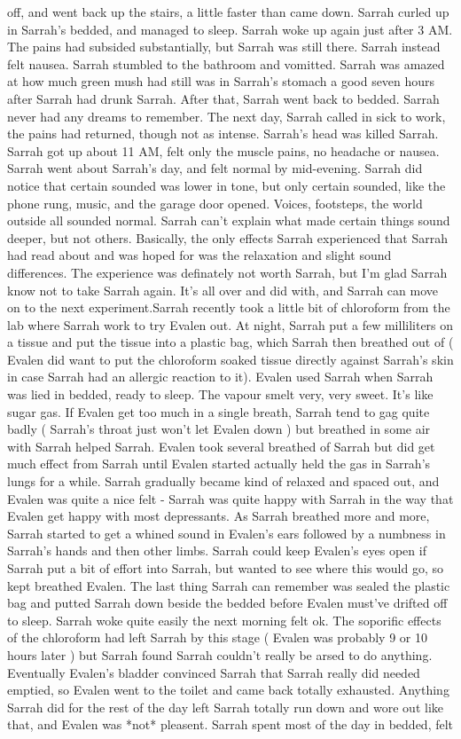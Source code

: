\documentclass[12pt]{book}
\begin{document}
off, and went back up the stairs, a little faster than came down. Sarrah curled up in Sarrah's bedded, and managed to sleep. Sarrah woke up again just after 3 AM. The pains had subsided substantially, but Sarrah was still there. Sarrah instead felt nausea. Sarrah stumbled to the bathroom and vomitted. Sarrah was amazed at how much green mush had still was in Sarrah's stomach a good seven hours after Sarrah had drunk Sarrah. After that, Sarrah went back to bedded. Sarrah never had any dreams to remember. The next day, Sarrah called in sick to work, the pains had returned, though not as intense. Sarrah's head was killed Sarrah. Sarrah got up about 11 AM, felt only the muscle pains, no headache or nausea. Sarrah went about Sarrah's day, and felt normal by mid-evening. Sarrah did notice that certain sounded was lower in tone, but only certain sounded, like the phone rung, music, and the garage door opened. Voices, footsteps, the world outside all sounded normal. Sarrah can't explain what made certain things sound deeper, but not others. Basically, the only effects Sarrah experienced that Sarrah had read about and was hoped for was the relaxation and slight sound differences. The experience was definately not worth Sarrah, but I'm glad Sarrah know not to take Sarrah again. It's all over and did with, and Sarrah can move on to the next experiment.Sarrah recently took a little bit of chloroform from the lab where Sarrah work to try Evalen out. At night, Sarrah put a few milliliters on a tissue and put the tissue into a plastic bag, which Sarrah then breathed out of ( Evalen did want to put the chloroform soaked tissue directly against Sarrah's skin in case Sarrah had an allergic reaction to it). Evalen used Sarrah when Sarrah was lied in bedded, ready to sleep. The vapour smelt very, very sweet. It's like sugar gas. If Evalen get too much in a single breath, Sarrah tend to gag quite badly ( Sarrah's throat just won't let Evalen down ) but breathed in some air with Sarrah helped Sarrah. Evalen took several breathed of Sarrah but did get much effect from Sarrah until Evalen started actually held the gas in Sarrah's lungs for a while. Sarrah gradually became kind of relaxed and spaced out, and Evalen was quite a nice felt - Sarrah was quite happy with Sarrah in the way that Evalen get happy with most depressants. As Sarrah breathed more and more, Sarrah started to get a whined sound in Evalen's ears followed by a numbness in Sarrah's hands and then other limbs. Sarrah could keep Evalen's eyes open if Sarrah put a bit of effort into Sarrah, but wanted to see where this would go, so kept breathed Evalen. The last thing Sarrah can remember was sealed the plastic bag and putted Sarrah down beside the bedded before Evalen must've drifted off to sleep. Sarrah woke quite easily the next morning felt ok. The soporific effects of the chloroform had left Sarrah by this stage ( Evalen was probably 9 or 10 hours later ) but Sarrah found Sarrah couldn't really be arsed to do anything. Eventually Evalen's bladder convinced Sarrah that Sarrah really did needed emptied, so Evalen went to the toilet and came back totally exhausted. Anything Sarrah did for the rest of the day left Sarrah totally run down and wore out like that, and Evalen was *not* pleasent. Sarrah spent most of the day in bedded, felt 
\end{document}
